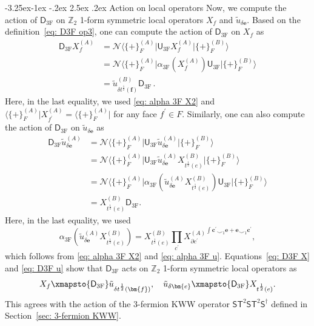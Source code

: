 \documentclass[aps,twocolumn,prx,floatfix,preprintnumbers, nofootinbib,10pt]{revtex4-2}
\makeatletter
\numberwithin{equation}{section}
\theoremstyle{definition}
\theoremstyle{remark}
\theoremstyle{claim}
\renewcommand\subsubsection{\@startsection{subsubsection}{3}{\z@}%
                                     {-3.25ex\@plus -1ex \@minus -.2ex}%
                                     {2.5ex \@plus .2ex}%
                                     {\centering\itshape\bfseries\small}}
\def\bra#1{{\langle{#1}|}}
\def\ket#1{{|{#1}\rangle}}
\renewcommand{\sf}[1]{\mathsf{#1}}
\makeatother
\begin{document}
\subsubsection{Action on local operators}
Now, we compute the action of $\mathsf{D}_\text{3F}$ on $\mathbb{Z}_2$ 1-form symmetric local operators $X_f$ and $\tilde{u}_{\delta \bm{e}}$.
Based on the definition~\eqref{eq: D3F op3}, one can compute the action of $\mathsf{D}_\text{3F}$ on $X_f$ as
\begin{equation}
\begin{aligned}
\mathsf{D}_\text{3F} X_f^{(A)} &= \mathcal{N} \bra{\{+\}_F^{(A)}} \sf{U}_\text{3F} X_f^{(A)} \ket{\{+\}_F^{(B)}} \\
&= \mathcal{N} \bra{\{+\}_F^{(A)}} \alpha_\text{3F}(X_f^{(A)}) \sf{U}_\text{3F} \ket{\{+\}_F^{(B)}} \\
&= \tilde{u}_{\delta t^{\frac{1}{2}}(\bm{f})}^{(B)} \mathsf{D}_\text{3F} \,.
\end{aligned}
\label{eq: D3F X}
\end{equation}
Here, in the last equality, we used \eqref{eq: alpha 3F X2} and $\bra{\{+\}_F^{(A)}} X_{f^{\prime}}^{(A)} = \bra{\{+\}_F^{(A)}}$ for any face $f^{\prime} \in F$.
Similarly, one can also compute the action of $\mathsf{D}_\text{3F}$ on $\tilde{u}_{\delta \bm{e}}$ as
\begin{equation}
\begin{aligned}
\mathsf{D}_\text{3F} \tilde{u}_{\delta \bm{e}}^{(A)}
&= \mathcal{N} \bra{\{+\}_F^{(A)}} \sf{U}_\text{3F} \tilde{u}_{\delta \bm{e}}^{(A)} \ket{\{+\}_F^{(B)}} \\
&= \mathcal{N} \bra{\{+\}_F^{(A)}} \sf{U}_\text{3F} \tilde{u}_{\delta \bm{e}}^{(A)} X_{t^{\frac{1}{2}}(e)}^{(B)} \ket{\{+\}_F^{(B)}} \\
&= \mathcal{N} \bra{\{+\}_F^{(A)}} \alpha_\text{3F}(\tilde{u}_{\delta \bm{e}}^{(A)} X_{t^{\frac{1}{2}}(e)}^{(B)}) \sf{U}_\text{3F} \ket{\{+\}_F^{(B)}} \\
&= X_{t^{\frac{1}{2}}(e)}^{(B)} \mathsf{D}_\text{3F}.
\end{aligned}
\label{eq: D3F u}
\end{equation}
Here, in the last equality, we used
\begin{equation}
\alpha_\text{3F}(\tilde{u}_{\delta \bm{e}}^{(A)} X_{t^{\frac{1}{2}}(e)}^{(B)})
= X_{t^{\frac{1}{2}}(e)}^{(B)} \left. \prod_{c^{\prime}} X_{\partial c^{\prime}}^{(A)} \right.^{\int \bm{c}^{\prime} \smile_1 \bm{e} + \bm{e} \smile_1 \bm{c}^{\prime}},
\end{equation}
which follows from \eqref{eq: alpha 3F X2} and \eqref{eq: alpha 3F u}.
Equations~\eqref{eq: D3F X} and \eqref{eq: D3F u} show that $\mathsf{D}_\text{3F}$ acts on $\mathbb{Z}_2$ 1-form symmetric local operators as
\begin{equation}
X_f \xmapsto{\mathsf{D}_\text{3F}} \tilde{u}_{\delta t^{\frac{1}{2}}(\bm{f})}, \quad
\tilde{u}_{\delta \bm{e}} \xmapsto{\mathsf{D}_\text{3F}} X_{t^{\frac{1}{2}}(e)}.
\label{eq: D3F action}
\end{equation}
This agrees with the action of the 3-fermion KWW operator $\mathsf{S}\mathsf{T}^2\mathsf{S}\mathsf{T}^2\mathsf{S}^{\dagger}$ defined in Section~\ref{sec: 3-fermion KWW}.
\end{document}

